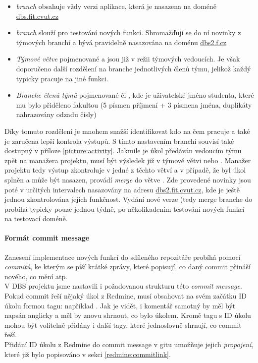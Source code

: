 \begin{itemize}
	\item \emph{ branch} obsahuje vždy verzi aplikace, která je nasazena na doméně \url{dbs.fit.cvut.cz}
	\item \emph{ branch} slouží pro testování nových funkcí. Shromažďují se do ní novinky z týmových branchí a bývá pravidelně nasazována na doménu \url{dbs2.f.cz}
	\item \emph{Týmové větve} pojmenované  a  jsou již v režii týmových vedoucích. Je však doporučeno další rozdělení na branche jednotlivých členů týmu, jelikož každý typicky pracuje na jiné funkci.
	\item \emph{Branche členů týmů} pojmenované  či , kde  je uživatelské jméno studenta, které mu bylo přiděleno fakultou (5 písmen příjmení + 3 písmena jména, duplikáty nahrazovány odzadu čísly)
\end{itemize}
Díky tomuto rozdělení je mnohem snažší identifikovat kdo na čem pracuje a také je zaručena lepší kontrola výstupů. S tímto nastavením branchí souvisí také  dostupný v příloze \ref{picture:activity}. Jakmile je úkol předáván vedoucím týmu zpět na manažera projektu, musí být výsledek již v týmové větvi  nebo . Manažer projektu tedy výstup zkontroluje v jedné z těchto větví a v případě, že byl úkol splněn a může být nasazen, provádí \emph{merge} do větve . Zde provedené novinky jsou poté v určitých intervalech nasazovány na adresu \url{dbs2.fit.cvut.cz}, kde je ještě jednou zkontrolována jejich funkčnost. Vydání nové verze (tedy merge branche  do  probíhá typicky pouze jednou týdně, po několikadením testování nových funkcí na testovací doméně.

\paragraph{Formát commit message} \label{version:git:commit}

Zanesení implementace nových funkcí do sdíleného repozitáře probíhá pomocí \emph{commitů}, ke kterým se píší krátké zprávy, které popisují, co daný commit přináší nového, co mění atp.\\
V DBS projektu jsme nastavili i požadovanou strukturu této \emph{commit message}. Pokud commit řeší nějaký úkol z Redmine, musí obsahovat na svém začátku ID úkolu formou tagu: například . Jak je vidět, i komentář samotný by měl být napsán anglicky a měl by znovu shrnout, co bylo úkolem. Kromě tagu s ID úkolu mohou být volitelně přidány i další tagy, které jednoslovně shrnují, co commit řeší.\\
Přidání ID úkolu z Redmine do commit message v gitu umožňuje jejich \emph{propojení}, které již bylo popisováno v sekci \ref{redmine:commitlink}.


